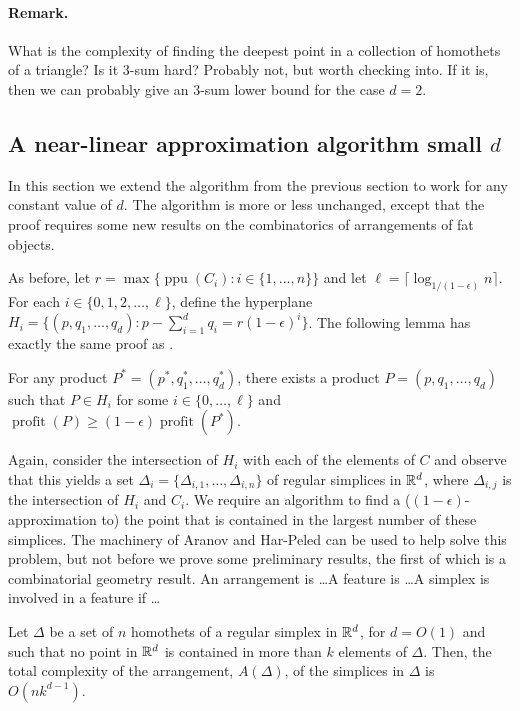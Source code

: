\documentclass[lotsofwhite]{patmorin}
\newcommand{\ppu}{\operatorname{ppu}}
\newcommand{\val}{\operatorname{profit}}
\newcommand{\eps}{\epsilon}
\begin{document}
\paragraph{Remark.} What is the complexity of finding the deepest
point in a collection of homothets of a triangle?  Is it 3-sum hard?
Probably not, but worth checking into.  If it is, then we can probably
give an 3-sum lower bound for the case $d=2$.

\subsection{A near-linear approximation algorithm small $d$}

In this section we extend the algorithm from the previous section to work
for any constant value of $d$.  The algorithm is more or less unchanged,
except that the proof requires some new results on the combinatorics of
arrangements of fat objects.

As before, let $r=\max\{\ppu(C_i) : i\in\{1,\ldots, n\}\}$ and let $\ell =
\lceil\log_{1/(1-\eps)} n\rceil$. For each $i\in\{0,1,2,\ldots,\ell\}$,
define the hyperplane $H_i = \{ (p,q_1,\ldots,q_d) : p-\sum_{i=1}^d
q_i =  r(1-\eps)^i \}$.  The following lemma has exactly the same proof
as .

\begin{lem}
  For any product $P^*=(p^*,q_1^*,\ldots,q_d^*)$, there exists
  a product $P=(p,q_1,\ldots,q_d)$ such that $P\in H_i$ for some
  $i\in\{0,\ldots,\ell\}$ and $\val(P) \ge (1-\eps)\val(P^*)$.
\end{lem}

Again, consider the intersection of $H_i$ with each of the elements of $C$
and observe that this yields a set
$\Delta_i=\{\Delta_{i,1},\ldots,\Delta_{i,n}\}$ of regular simplices in
$\mathbb{R}^d$, where $\Delta_{i,j}$ is the intersection of $H_i$ and $C_i$.  We
require an algorithm to find a ($(1-\eps)$-approximation to) the point that
is contained in the largest number of these simplices.  The machinery of
Aranov and Har-Peled can be used to help solve this problem, but not before
we prove some preliminary results, the first of which is a combinatorial
geometry result.  An arrangement is \ldots A feature is \ldots A simplex is
involved in a feature if \ldots

\begin{lem}
Let $\Delta$ be a set of $n$ homothets of a regular simplex in $\mathbb{R}^d$, for
$d=O(1)$ and such that no point in $\mathbb{R}^d$ is contained in more than $k$
elements of $\Delta$.  Then, the total complexity of the arrangement,
$A(\Delta)$, of the simplices in $\Delta$ is $O(nk^{d-1})$.
\end{lem}
\end{document}
